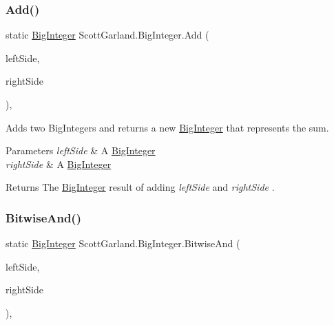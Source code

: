 \subsubsection{\texorpdfstring{Add()}{Add()}}
{\footnotesize\ttfamily static \hyperlink{class_scott_garland_1_1_big_integer}{Big\+Integer} Scott\+Garland.\+Big\+Integer.\+Add (\begin{DoxyParamCaption}\item[{\hyperlink{class_scott_garland_1_1_big_integer}{Big\+Integer}}]{left\+Side,  }\item[{\hyperlink{class_scott_garland_1_1_big_integer}{Big\+Integer}}]{right\+Side }\end{DoxyParamCaption})\hspace{0.3cm}{\ttfamily [inline]}, {\ttfamily [static]}}



Adds two Big\+Integers and returns a new \hyperlink{class_scott_garland_1_1_big_integer}{Big\+Integer} that represents the sum. 


\begin{DoxyParams}{Parameters}
{\em left\+Side} & A \hyperlink{class_scott_garland_1_1_big_integer}{Big\+Integer}\\
\hline
{\em right\+Side} & A \hyperlink{class_scott_garland_1_1_big_integer}{Big\+Integer}\\
\hline
\end{DoxyParams}
\begin{DoxyReturn}{Returns}
The \hyperlink{class_scott_garland_1_1_big_integer}{Big\+Integer} result of adding {\itshape left\+Side}  and {\itshape right\+Side} .
\end{DoxyReturn}
\mbox{\label{class_scott_garland_1_1_big_integer_a05ff68999479aa04b422ddb59ea5fd61}} 
\subsubsection{\texorpdfstring{Bitwise\+And()}{BitwiseAnd()}}
{\footnotesize\ttfamily static \hyperlink{class_scott_garland_1_1_big_integer}{Big\+Integer} Scott\+Garland.\+Big\+Integer.\+Bitwise\+And (\begin{DoxyParamCaption}\item[{\hyperlink{class_scott_garland_1_1_big_integer}{Big\+Integer}}]{left\+Side,  }\item[{\hyperlink{class_scott_garland_1_1_big_integer}{Big\+Integer}}]{right\+Side }\end{DoxyParamCaption})\hspace{0.3cm}{\ttfamily [inline]}, {\ttfamily [static]}}



